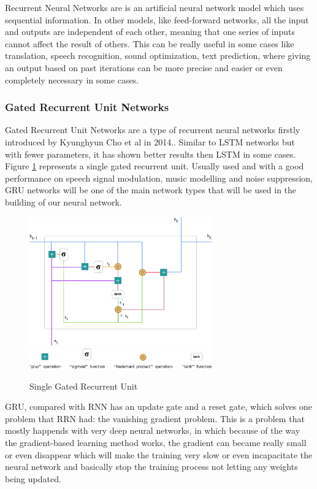 Recurrent Neural Networks are is an artificial neural network model which uses sequential information. In other models, like feed-forward networks, all the input and outputs are independent of each other, meaning that one series of inputs cannot affect the result of others.
This can be really useful in some cases like translation, speech recognition, sound optimization, text prediction, where giving an output based on past iterations can be more precise and easier or even completely necessary in some cases.

\newpage
\subsubsection{Gated Recurrent Unit Networks} 

Gated Recurrent Unit Networks are a type of recurrent neural networks firstly introduced 
by Kyunghyun Cho et al in 2014.\cite{GRU}. Similar to LSTM networks but with fewer 
parameters, it has shown better results then LSTM in some cases. Figure \ref{fig:GRU} represents a single gated recurrent unit. 
Usually used and with a good performance on speech signal modulation, music modelling and noise suppression, 
GRU networks will be one of the main network types that will be used in the building of our neural network.

\begin{figure}[htp]
	\centering
	\includegraphics[width=0.7\textwidth]{Illustrations/GRU.png}
	\includegraphics[width=0.7\textwidth]{Illustrations/GRUsymbols.png}
	\caption{Single Gated Recurrent Unit}\cite{GRUPHOTOS}
	\label{fig:GRU}
\end{figure}


GRU, compared with RNN has an update gate and a reset gate, which solves one problem that RRN had: the vanishing gradient problem. This is a problem that mostly happends with very deep neural networks, in which because of the way the gradient-based learning method works, the gradient can became really small or even disappear which will make the training very slow or even incapacitate the neural network and basically stop the training process not letting any weights being updated.


